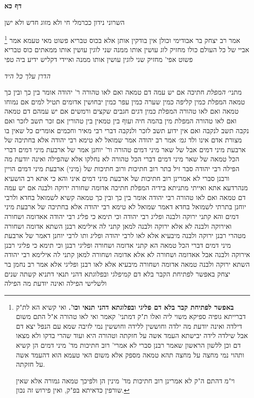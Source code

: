 \documentclass[12pt, openany]{book}
\newcommand{\sethebfont}{
\fontsize{10.5pt}{21.0pt} \selectfont
}
\newcommand{\twocol}[1]{
	{\sethebfont \begin{multicols}{2}
			#1
	\end{multicols}}	
}
\newcommand{\sectname}{}
\newcommand{\newsection}[1]{
	\addcontentsline{toc}{section}{#1}
	\renewcommand{\sectname}{#1}	
	\vspace{-\baselineskip}
	\begin{center}
		\textbf{%
\fontsize{16pt}{16pt}\selectfont
			#1}
	\end{center}
	\vspace{-\baselineskip}
	\nopagebreak
}
\newcommand{\footnotecomment}[1]{
	\renewcommand\thefootnote{}
	\footnote{#1}}
\newcommand{\commenta}[1]{\footnotecomment{#1}}
\begin{document}
\newsection{דף כא}
\twocol{השרוני נידון ככרמלי חי ולא מזוג חדש ולא ישן 
\commenta{\textbf{באפשר לפתיחת קבר בלא דם פליגי ובפלוגתא דהני תנאי וכו'.} ואי קשיא הא לת"ק דברייתא גופיה ספיקא משוי ליה ואלו ת"ק דמתני' קאמר ואי לאו טהורה א"ל התם משום דילדה ואינה יודעת מה ילדה וחוששין ללידה וחוששין נמי לזיבה שמא עם הנפל יצא דם אבל שילדה לידה יבישתא העמד אשה על חזקתה וטהורה היא ועוד שהרי בדקו ולא מצאו דם וכן ללשון הראשון שאמר רבנן סברי לא אמרי' רוב חתיכות מד' מיני דמים הן קשיא ותהוי נמי מחצה על מחצה תהא טמאה מספק אלא משום האי טעמא הוא דהעמד אשה על חזקתה.\par וי"מ דהתם ה"ק לא אמרינן רוב חתיכות מד' מינין הן ולפיכך טמאה גמורה אלא שאין שורפין כדאיתא בפ"ק, ואין פירוש זה נכון. }
אמר רב יצחק בר אבודימי וכולן אין בודקין אותן אלא בכוס טבריא פשוט מאי טעמא אמר אביי של כל העולם כולו מחזיק לוג עושין אותו ממנה שני לוגין עושין אותו ממאתים כוס טבריא פשוט אפי' מחזיק שני לוגין עושין אותו ממנה ואיידי דקליש ידיע ביה טפי
\par \par {\large\emph{הדרן עלך כל היד}}\par \par 
מתני׳ {\large\emph{המפלת}} חתיכה אם יש עמה דם טמאה ואם לאו טהורה ר' יהודה אומר בין כך ובין כך טמאה 
המפלת כמין קליפה כמין שערה כמין עפר כמין יבחושין אדומים תטיל למים אם נמוחו טמאה ואם לאו טהורה 
המפלת כמין דגים חגבים שקצים ורמשים אם יש עמהם דם טמאה ואם לאו טהורה 
המפלת מין בהמה חיה ועוף בין טמאין בין טהורין אם זכר תשב לזכר ואם נקבה תשב לנקבה
ואם אין ידוע תשב לזכר ולנקבה דברי רבי מאיר וחכמים אומרים כל שאין בו מצורת אדם אינו ולד
{\large\emph{גמ׳}} אמר רב יהודה אמר שמואל לא טימא רבי יהודה אלא בחתיכה של ארבעת מיני דמים אבל של שאר מיני דמים טהורה 
ור' יוחנן אמר של ארבעת מיני דמים דברי הכל טמאה של שאר מיני דמים דברי הכל טהורה 
לא נחלקו אלא שהפילה ואינה יודעת מה הפילה רבי יהודה סבר זיל בתר רוב חתיכות ורוב חתיכות של (מיני) ארבעת מיני דמים הויין ורבנן סברי לא אמרינן רוב חתיכות של ארבעת מיני דמים 
איני והא כי אתא רב הושעיא מנהרדעא אתא ואייתי מתניתא בידיה המפלת חתיכה אדומה שחורה ירוקה ולבנה אם יש עמה דם טמאה ואם לאו טהורה רבי יהודה אומר בין כך ובין כך טמאה קשיא לשמואל בחדא ולרבי יוחנן בתרתי 
לשמואל בחדא דאמר שמואל לא טימא רבי יהודה אלא בחתיכה של ארבעת מיני דמים והא קתני ירוקה ולבנה ופליג רבי יהודה 
וכי תימא כי פליג רבי יהודה אאדומה ושחורה ואירוקה ולבנה לא אלא ירוקה ולבנה למאן קתני לה 
אילימא רבנן השתא אדומה ושחורה מטהרי רבנן ירוקה ולבנה מיבעיא אלא לאו לרבי יהודה ופליג 
ותו לרבי יוחנן דאמר של ארבעת מיני דמים דברי הכל טמאה הא קתני אדומה ושחורה ופליגי רבנן 
וכי תימא כי פליגי רבנן אירוקה ולבנה אבל אאדומה ושחורה לא אלא אדומה ושחורה למאן קתני לה 
אילימא רבי יהודה השתא ירוקה ולבנה טמאה אדומה ושחורה מיבעיא אלא לאו רבנן ופליגי 
אלא אמר רב נחמן בר יצחק באפשר לפתיחת הקבר בלא דם קמיפלגי ובפלוגתא דהני תנאי דתניא קשתה שנים ולשלישי הפילה ואינה יודעת מה הפילה}
\end{document}
